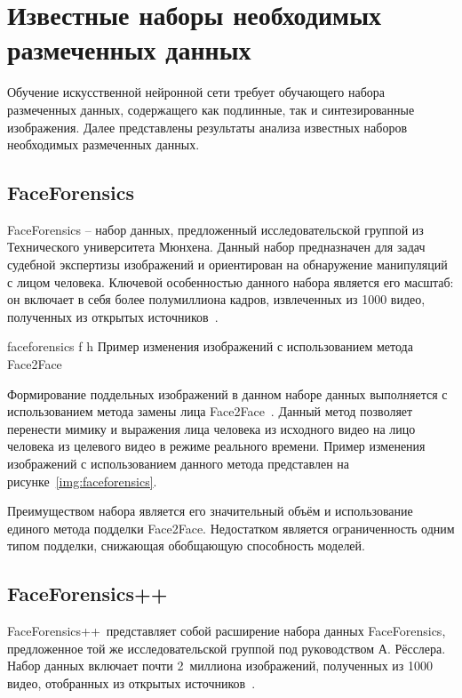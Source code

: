 \section{Известные наборы необходимых размеченных данных}

Обучение искусственной нейронной сети требует обучающего набора размеченных данных, содержащего как подлинные, так и синтезированные изображения. Далее представлены результаты анализа известных наборов необходимых размеченных данных.

\subsection{FaceForensics}

FaceForensics -- набор данных, предложенный исследовательской группой из Технического университета Мюнхена. Данный набор предназначен для задач судебной экспертизы изображений и ориентирован на обнаружение манипуляций с лицом человека. Ключевой особенностью данного набора является его масштаб: он включает в себя более полумиллиона кадров, извлеченных из 1000 видео, полученных из открытых источников~\cite{faceforensics}.

{faceforensics}
{f} %
{h}
{\textwidth} %
{Пример изменения изображений с использованием метода Face2Face}

Формирование поддельных изображений в данном наборе данных выполняется с использованием метода замены лица Face2Face~\cite{face2face}. Данный метод позволяет перенести мимику и выражения лица человека из исходного видео на лицо человека из целевого видео в режиме реального времени. Пример изменения изображений с использованием данного метода представлен на рисунке~\ref{img:faceforensics}.

Преимуществом набора является его значительный объём и использование единого метода подделки Face2Face. Недостатком является ограниченность одним типом подделки, снижающая обобщающую способность моделей.

\subsection{FaceForensics++}

FaceForensics++~представляет собой расширение набора данных FaceForensics, предложенное той же исследовательской группой под руководством А. Рёсслера. Набор данных включает почти 2~миллиона изображений, полученных из 1000 видео, отобранных из открытых источников~\cite{faceforensicspp}. 

